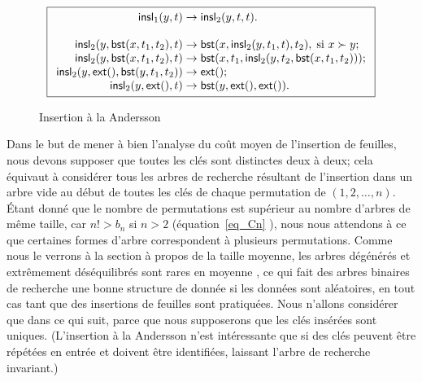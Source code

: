 \begin{figure}
\begin{equation*}
\boxed{
\begin{array}{r@{\;}l@{\;}l}
\fun{insl}_1(y,t) & \rightarrow & \fun{insl}_2(y,t,t).\\
\\
\fun{insl}_2(y,\fun{bst}(x,t_1,t_2),t) & \rightarrow &
  \fun{bst}(x,\fun{insl}_2(y,t_1,t),t_2), \; \text{si \(x \succ y\)};\\
\fun{insl}_2(y,\fun{bst}(x,t_1,t_2),t) & \rightarrow &
  \fun{bst}(x,t_1,\fun{insl}_2(y,t_2,\fun{bst}(x,t_1,t_2)));\\
\fun{insl}_2(y,\fun{ext}(),\fun{bst}(y,t_1,t_2)) & \rightarrow & \fun{ext}();\\
\fun{insl}_2(y,\fun{ext}(),t) & \rightarrow & \fun{bst}(y,\fun{ext}(),\fun{ext}()).
\end{array}}
\end{equation*}
\caption{Insertion à la Andersson\label{fig:insl1}}
\end{figure}


Dans le but de mener à bien l'analyse du coût moyen de l'insertion de
feuilles, nous devons supposer que toutes les clés sont distinctes
deux à deux; cela équivaut à considérer tous les arbres de recherche
résultant de l'insertion dans un arbre vide au début de toutes les
clés de chaque permutation de \((1,2,\dots,n)\). Étant donné que le
nombre de permutations est supérieur au nombre d'arbres de même
taille, car \(n! > b_n\) si \(n > 2\) (équation~\eqref{eq_Cn}
), nous nous attendons à ce que certaines formes
d'arbre correspondent à plusieurs permutations. Comme nous le verrons
à la section à propos de la taille moyenne, les arbres dégénérés et
extrêmement déséquilibrés sont rares en moyenne \citep{Fill_1996}, ce
qui fait des arbres binaires de recherche une bonne structure de
donnée si les données sont aléatoires, en tout cas tant que des
insertions de feuilles sont pratiquées. Nous n'allons considérer que
 dans ce qui suit, parce que nous supposerons que les clés
insérées sont uniques. (L'insertion à la Andersson n'est intéressante
que si des clés peuvent être répétées en entrée et doivent être
identifiées, laissant l'arbre de recherche invariant.)

